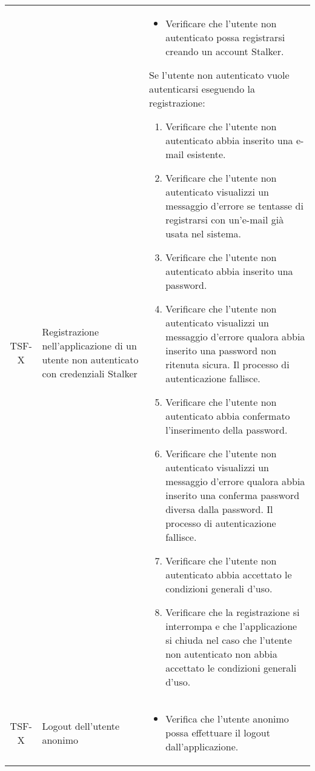 {\begin{longtable}{ c | C{3cm} | C{11cm} }
TSF-X & Registrazione nell'applicazione di un utente non autenticato con credenziali Stalker & \begin{itemize}
    \item Verificare che l'utente non autenticato possa registrarsi creando un account Stalker.
\end{itemize}
Se l'utente non autenticato vuole autenticarsi eseguendo la registrazione:
\begin{enumerate}
    \item Verificare che l'utente non autenticato abbia inserito una e-mail esistente.
    \item Verificare che l'utente non autenticato visualizzi un messaggio d'errore se tentasse di registrarsi con un'e-mail già usata nel sistema.
    \item Verificare che l'utente non autenticato abbia inserito una password.
    \item Verificare che l'utente non autenticato visualizzi un messaggio d'errore qualora abbia inserito una password non ritenuta sicura. Il processo di autenticazione fallisce.
    \item Verificare che l'utente non autenticato abbia confermato l'inserimento della password.
    \item Verificare che l'utente non autenticato visualizzi un messaggio d'errore qualora abbia inserito una conferma password diversa dalla password. Il processo di autenticazione fallisce.
    \item Verificare che l'utente non autenticato abbia accettato le condizioni generali d'uso.
    \item Verificare che la registrazione si interrompa e che l'applicazione si chiuda nel caso che l'utente non autenticato non abbia accettato le condizioni generali d'uso.
\end{enumerate} \\

TSF-X & Logout dell'utente anonimo & \begin{itemize}
    \item Verifica che l'utente anonimo possa effettuare il logout dall'applicazione.
\end{itemize} \\


\end{longtable}}
